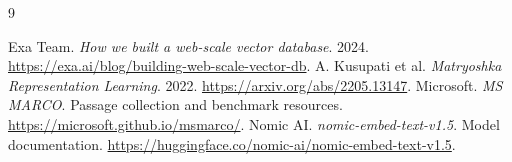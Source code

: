 \begin{thebibliography}{9}\small\raggedright
{} Exa Team. \emph{How we built a web-scale vector database}. 2024.
\url{https://exa.ai/blog/building-web-scale-vector-db}.
 A. Kusupati et al. \emph{Matryoshka Representation Learning}. 2022.
\url{https://arxiv.org/abs/2205.13147}.
 Microsoft. \emph{MS MARCO}. Passage collection and benchmark resources.
\url{https://microsoft.github.io/msmarco/}.
 Nomic AI. \emph{nomic-embed-text-v1.5}. Model documentation.
\url{https://huggingface.co/nomic-ai/nomic-embed-text-v1.5}.
\end{thebibliography}
